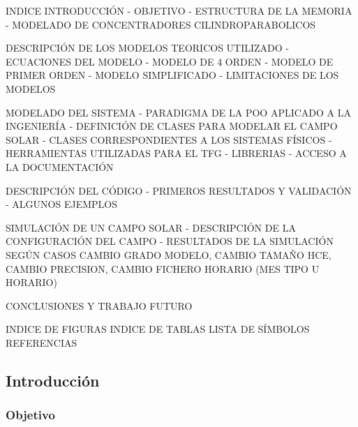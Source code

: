 % 





INDICE INTRODUCCIÓN - OBJETIVO - ESTRUCTURA DE LA MEMORIA - MODELADO DE
CONCENTRADORES CILINDROPARABOLICOS

DESCRIPCIÓN DE LOS MODELOS TEORICOS UTILIZADO - ECUACIONES DEL MODELO -
MODELO DE 4 ORDEN - MODELO DE PRIMER ORDEN - MODELO SIMPLIFICADO -
LIMITACIONES DE LOS MODELOS

MODELADO DEL SISTEMA - PARADIGMA DE LA POO APLICADO A LA INGENIERÍA -
DEFINICIÓN DE CLASES PARA MODELAR EL CAMPO SOLAR - CLASES
CORRESPONDIENTES A LOS SISTEMAS FÍSICOS - HERRAMIENTAS UTILIZADAS PARA
EL TFG - LIBRERIAS - ACCESO A LA DOCUMENTACIÓN

DESCRIPCIÓN DEL CÓDIGO - PRIMEROS RESULTADOS Y VALIDACIÓN - ALGUNOS
EJEMPLOS

SIMULACIÓN DE UN CAMPO SOLAR - DESCRIPCIÓN DE LA CONFIGURACIÓN DEL CAMPO
- RESULTADOS DE LA SIMULACIÓN SEGÚN CASOS CAMBIO GRADO MODELO, CAMBIO
TAMAÑO HCE, CAMBIO PRECISION, CAMBIO FICHERO HORARIO (MES TIPO U
HORARIO)

CONCLUSIONES Y TRABAJO FUTURO

INDICE DE FIGURAS INDICE DE TABLAS LISTA DE SÍMBOLOS REFERENCIAS

\hypertarget{introducciuxf3n}{%
\subsection{Introducción}\label{introducciuxf3n}}

\hypertarget{objetivo}{%
\subsubsection{Objetivo}\label{objetivo}}

